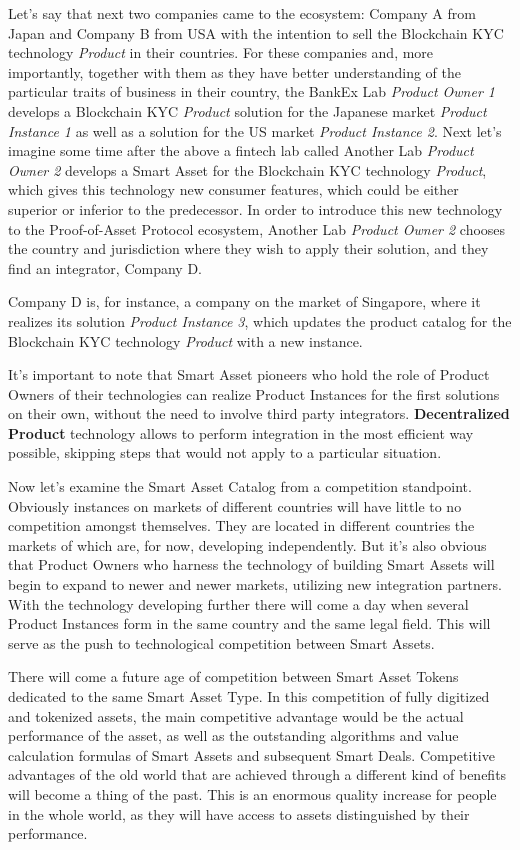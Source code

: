 \documentclass{article}
\begin{document}
\begin{multicols}{2}
Let’s say that next two companies came to the ecosystem: Company A from Japan and Company B from USA with the intention to sell the Blockchain KYC technology \textit{Product} in their countries. For these companies and, more importantly, together with them as they have better understanding of the particular traits of business in their country, the BankEx Lab \textit{Product Owner 1} develops a Blockchain KYC \textit{Product} solution for the Japanese market \textit{Product Instance 1} as well as a solution for the US market \textit{Product Instance 2}.
Next let’s imagine some time after the above a fintech lab called Another Lab \textit{Product Owner 2} develops a Smart Asset for the Blockchain KYC technology \textit{Product}, which gives this technology new consumer features, which could be either superior or inferior to the predecessor. In order to introduce this new technology to the Proof-of-Asset Protocol ecosystem, Another Lab \textit{Product Owner 2} chooses the country and jurisdiction where they wish to apply their solution, and they find an integrator, Company D.

Company D is, for instance, a company on the market of Singapore, where it realizes its solution \textit{Product Instance 3}, which updates the product catalog for the Blockchain KYC technology \textit{Product} with a new instance.

It’s important to note that Smart Asset pioneers who hold the role of Product Owners of their technologies can realize Product Instances for the first solutions on their own, without the need to involve third party integrators. \textbf{Decentralized Product} technology allows to perform integration in the most efficient way possible, skipping steps that would not apply to a particular situation.

Now let's examine the Smart Asset Catalog from a competition standpoint. Obviously instances on markets of different countries will have little to no competition amongst themselves. They are located in different countries the markets of which are, for now, developing independently. But it’s also obvious that Product Owners who harness the technology of building Smart Assets will begin to expand to newer and newer markets, utilizing new integration partners. With the technology developing further there will come a day when several Product Instances form in the same country and the same legal field. This will serve as the push to technological competition between Smart Assets.

There will come a future age of competition between Smart Asset Tokens dedicated to the same Smart Asset Type. In this competition of fully digitized and tokenized assets, the main competitive advantage would be the actual performance of the asset, as well as the outstanding algorithms and value calculation formulas of Smart Assets and subsequent Smart Deals. Competitive advantages of the old world that are achieved through a different kind of benefits will become a thing of the past. This is an enormous quality increase for people in the whole world, as they will have access to assets distinguished by their performance. 


\end{multicols}
\end{document}

